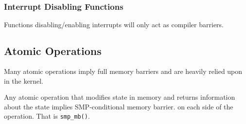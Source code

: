 \documentclass{article}
\begin{document}










\subsubsection{Interrupt Disabling Functions}


Functions disabling/enabling interrupts will only act as compiler
barriers. 


\subsection{Atomic Operations}

Many atomic operations imply full memory barriers and are heavily
relied upon in the kernel.

Any atomic operation that modifies state in memory and returns
information about the state implies SMP-conditional memory barrier.
on each side of the operation. That is \lstinline{smp_mb()}.
\end{document}
